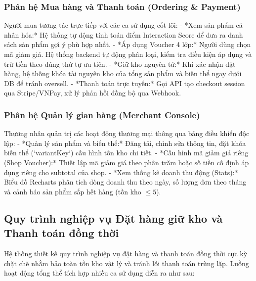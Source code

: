 \documentclass[../DoAn.tex]{subfiles}
\begin{document}
\subsubsection{Phân hệ Mua hàng và Thanh toán (Ordering & Payment)}
Người mua tương tác trực tiếp với các ca sử dụng cốt lõi:
- *Xem sản phẩm cá nhân hóa:* Hệ thống tự động tính toán điểm Interaction Score để đưa ra danh sách sản phẩm gợi ý phù hợp nhất.
- *Áp dụng Voucher 4 lớp:* Người dùng chọn mã giảm giá. Hệ thống backend tự động phân loại, kiểm tra điều kiện áp dụng và trừ tiền theo đúng thứ tự ưu tiên.
- *Giữ kho nguyên tử:* Khi xác nhận đặt hàng, hệ thống khóa tài nguyên kho của tổng sản phẩm và biến thể ngay dưới DB để tránh oversell.
- *Thanh toán trực tuyến:* Gọi API tạo checkout session qua Stripe/VNPay, xử lý phản hồi đồng bộ qua Webhook.

\subsubsection{Phân hệ Quản lý gian hàng (Merchant Console)}
Thương nhân quản trị các hoạt động thương mại thông qua bảng điều khiển độc lập:
- *Quản lý sản phẩm và biến thể:* Đăng tải, chỉnh sửa thông tin, đặt khóa biến thể (`variantKey`) cấu hình tồn kho chi tiết.
- *Cấu hình mã giảm giá riêng (Shop Voucher):* Thiết lập mã giảm giá theo phần trăm hoặc số tiền cố định áp dụng riêng cho subtotal của shop.
- *Xem thống kê doanh thu động (Stats):* Biểu đồ Recharts phân tích dòng doanh thu theo ngày, số lượng đơn theo tháng và cảnh báo sản phẩm sắp hết hàng (tồn kho $\le 5$).

\subsection{Quy trình nghiệp vụ Đặt hàng giữ kho và Thanh toán đồng thời}
\label{subsection:2.2.3}
Hệ thống thiết kế quy trình nghiệp vụ đặt hàng và thanh toán đồng thời cực kỳ chặt chẽ nhằm bảo toàn tồn kho vật lý và tránh lỗi thanh toán trùng lặp. Luồng hoạt động tổng thể tích hợp nhiều ca sử dụng diễn ra như sau:
\end{document}
